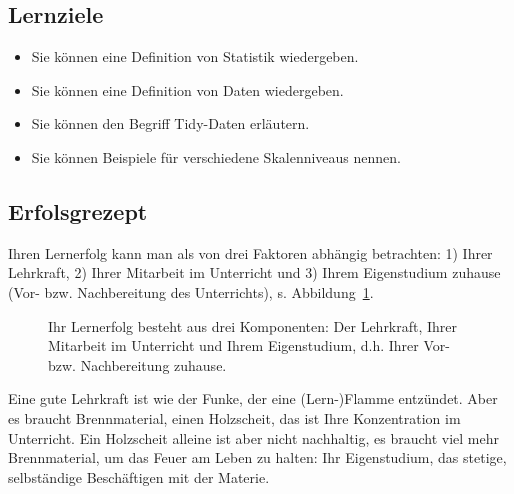 \documentclass[
  letterpaper,
  oneside,
  open=any]{scrbook}
\providecommand{\tightlist}{%
  \setlength{\itemsep}{0pt}\setlength{\parskip}{0pt}}\usepackage{longtable,booktabs,array}
\theoremstyle{definition}
\theoremstyle{definition}
\theoremstyle{definition}
\theoremstyle{remark}
\begin{document}
\subsection{Lernziele}\label{lernziele-1}

\begin{itemize}
\tightlist
\item
  Sie können eine Definition von Statistik wiedergeben.
\item
  Sie können eine Definition von Daten wiedergeben.
\item
  Sie können den Begriff Tidy-Daten erläutern.
\item
  Sie können Beispiele für verschiedene Skalenniveaus nennen.
\end{itemize}

\subsection{Erfolsgrezept}\label{erfolsgrezept}

Ihren Lernerfolg kann man als von drei Faktoren abhängig betrachten: 1)
Ihrer Lehrkraft, 2) Ihrer Mitarbeit im Unterricht und 3) Ihrem
Eigenstudium zuhause (Vor- bzw. Nachbereitung des Unterrichts), s.
Abbildung~\ref{fig-erfolgsrezept}.

\begin{figure}


\caption{\label{fig-erfolgsrezept}Ihr Lernerfolg besteht aus drei
Komponenten: Der Lehrkraft, Ihrer Mitarbeit im Unterricht und Ihrem
Eigenstudium, d.h. Ihrer Vor- bzw. Nachbereitung zuhause.}

\end{figure}%

Eine gute Lehrkraft ist wie der Funke, der eine (Lern-)Flamme entzündet.
Aber es braucht Brennmaterial, einen Holzscheit, das ist Ihre
Konzentration im Unterricht. Ein Holzscheit alleine ist aber nicht
nachhaltig, es braucht viel mehr Brennmaterial, um das Feuer am Leben zu
halten: Ihr Eigenstudium, das stetige, selbständige Beschäftigen mit der
Materie.
\end{document}
